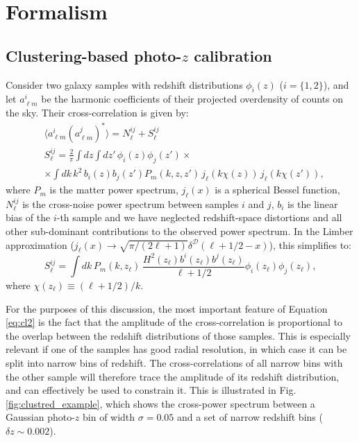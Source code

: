 \documentclass[prd,twocolumn]{revtex4}
\begin{document}
\section{Formalism}\label{sec:method}
  \subsection{Clustering-based photo-$z$ calibration}\label{ssec:method.clustred}
    Consider two galaxy samples with redshift distributions $\phi_i(z)$ ($i=\{1,2\}$),
    and let $a^i_{\ell m}$ be the harmonic coefficients of their projected overdensity
    of counts on the sky. Their cross-correlation is given by:
    \begin{align}
      &\langle a^i_{\ell m}(a^j_{\ell m})^*\rangle=N^{ij}_\ell+S^{ij}_\ell\\\label{eq:cl1}
      &S^{ij}_\ell=\frac{2}{\pi}\int dz \int dz'\,\phi_i(z)\phi_j(z')\times\\\nonumber
      &\times\int dk\,k^2\,b_i(z)b_j(z')P_m(k,z,z')\,j_\ell(k\chi(z))\,j_\ell(k\chi(z')),
    \end{align}
    where $P_m$ is the matter power spectrum, $j_\ell(x)$ is a spherical Bessel function,
    $N^{ij}_\ell$ is the cross-noise power spectrum between samples $i$ and $j$, $b_i$
    is the linear bias of the $i$-th sample and we have neglected redshift-space distortions
    and all other sub-dominant contributions to the observed power spectrum. In the Limber
    approximation ($j_\ell(x)\rightarrow\sqrt{\pi/(2\ell+1)}\delta^\mathcal{D}(\ell+1/2-x)$),
    this simplifies to:
    \begin{equation}\label{eq:cl2}
      S^{ij}_\ell=\int dk\,P_m(k,z_\ell)\,\frac{H^2(z_\ell)b^i(z_\ell)b^j(z_\ell)}{\ell+1/2}
      \phi_i(z_\ell)\phi_j(z_\ell),
    \end{equation}
    where $\chi(z_\ell)\equiv(\ell+1/2)/k$.

    For the purposes of this discussion, the most important feature of Equation \ref{eq:cl2}
    is the fact that the amplitude of the cross-correlation is proportional to the overlap
    between the redshift distributions of those samples. This is especially relevant if one
    of the samples has good radial resolution, in which case it can be split into narrow bins
    of redshift. The cross-correlations of all narrow bins with the other sample will
    therefore trace the amplitude of its redshift distribution, and can effectively be used
    to constrain it. This is illustrated in Fig. \ref{fig:clustred_example}, which shows the
    cross-power spectrum between a Gaussian photo-$z$ bin of width $\sigma=0.05$ and a set
    of narrow redshift bins ($\delta z\sim0.002$).
\end{document}
